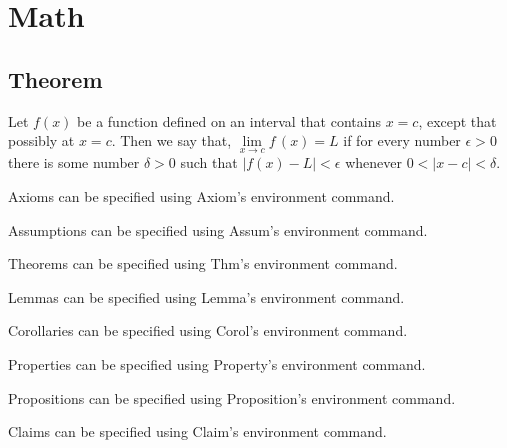 \documentclass[utf8,12pt]{article} %
\begin{document}
\section{Math}
%
%
\subsection{Theorem}
%
%
\begin{spacing}{1.5}
%
\begin{Def}
	Let $f\left(x\right)$ be a function defined on an interval that contains $x=c$,
	except that possibly at $x=c$. Then we say that,
	$\lim\limits_{x\rightarrow c} f\,(x)=L$
	if for every number $\epsilon > 0$ there is some number  $\delta > 0$ such that
	$\left\vert f(x)-L \right\vert < \epsilon$ whenever $0<\left\vert x-c \right\vert < \delta$.
\end{Def}

\begin{Axiom}
	Axioms can be specified using Axiom's environment command.
\end{Axiom}

\begin{Assum}
	Assumptions can be specified using Assum's environment command.
\end{Assum}

\begin{Thm}
	Theorems can be specified using Thm's environment command.
\end{Thm}

\begin{Lemma}
	Lemmas can be specified using Lemma's environment command.
\end{Lemma}

\begin{Corol}
	Corollaries can be specified using Corol's environment command.
\end{Corol}

\begin{Property}
	Properties can be specified using Property's environment command.
\end{Property}

\begin{Proposition}
	Propositions can be specified using Proposition's environment command.
\end{Proposition}

\begin{Claim}
	Claims can be specified using Claim's environment command.
\end{Claim}


\end{spacing}
\end{document}
